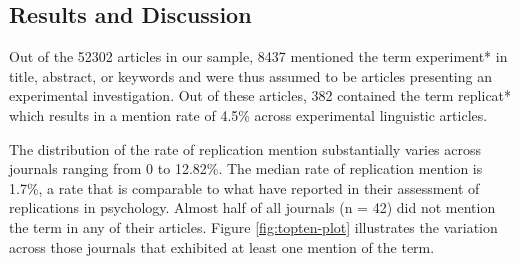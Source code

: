 \documentclass[cm,linguex]{glossa}
\begin{document}
\hypertarget{results-and-discussion}{%
\subsection{Results and Discussion}\label{results-and-discussion}}

Out of the 52302 articles in our sample, 8437 mentioned the term experiment* in title, abstract, or keywords and were thus assumed to be articles presenting an experimental investigation.
Out of these articles, 382 contained the term replicat* which results in a mention rate of 4.5\% across experimental linguistic articles.

The distribution of the rate of replication mention substantially varies across journals ranging from 0 to 12.82\%. The median rate of replication mention is 1.7\%, a rate that is comparable to what \citet{makel_replications_2012} have reported in their assessment of replications in psychology.
Almost half of all journals (n = 42) did not mention the term in any of their articles.
Figure \ref{fig:topten-plot} illustrates the variation across those journals that exhibited at least one mention of the term.
\end{document}
